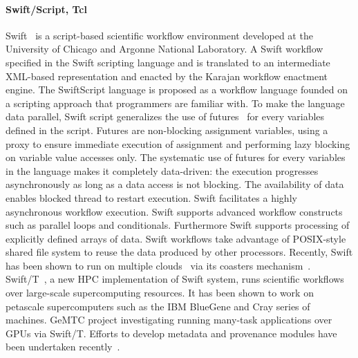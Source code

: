 \paragraph{Swift/Script, Tcl} Swift~\cite{swift} is a script-based scientific
workflow environment developed at the University of Chicago and Argonne
National Laboratory. A Swift workflow specified in the Swift scripting language
and is translated to an intermediate XML-based representation and enacted by
the Karajan workflow enactment engine. The SwiftScript language is proposed as
a workflow language founded on a scripting approach that programmers are
familiar with. To make the language data parallel, Swift script generalizes the
use of futures~\cite{futures} for every variables defined in the
script.  Futures are non-blocking assignment variables, using a proxy to ensure
immediate execution of assignment and performing lazy blocking on variable
value accesses only. The systematic use of futures for every variables in the
language makes it completely data-driven: the execution progresses
asynchronously as long as a data access is not blocking. The availability of
data enables blocked thread to restart execution. Swift facilitates a highly
asynchronous workflow execution. Swift supports advanced workflow constructs
such as parallel loops and conditionals. Furthermore Swift supports processing
of explicitly defined arrays of data. Swift workflows take advantage of
POSIX-style shared file system to reuse the data produced by other processors.
Recently, Swift has been shown to run on multiple clouds~\cite{ccgrid2013} via
its coasters mechanism~\cite{ucc2011}. Swift/T~\cite{turbine2013}, a new HPC
implementation of Swift system, runs scientific workflows over large-scale
supercomputing resources. It has been shown to work on petascale supercomputers
such as the IBM BlueGene and Cray series of machines. GeMTC project
investigating running many-task applications over GPUs via Swift/T. Efforts to develop metadata and provenance modules have been undertaken recently~\cite{swiftprov}.

